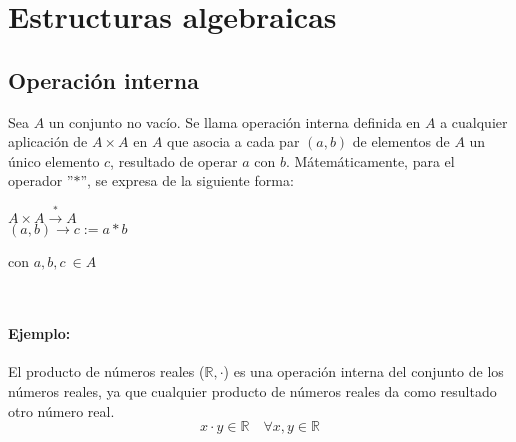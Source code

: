 \documentclass[0_algebra.tex]{subfiles}
\begin{document}
\setcounter{chapter}{1}

\chapter{Estructuras algebraicas}

\section{Operación interna}
Sea $A$ un conjunto no vacío. Se llama operación interna definida en $A$ a cualquier aplicación de $A \times A$ en $A$ que asocia a cada par $(a,b)$ de elementos de $A$ un único elemento $c$, resultado de operar $a$ con $b$. Mátemáticamente, para el operador ''$*$'', se expresa de la siguiente forma:\\

\begin{minipage}{0.5\textwidth}
\begin{center}
$A\times A \overset{*}{\rightarrow} A$\\
$(a,b) \rightarrow c:=a*b$
\end{center}
\end{minipage}
\begin{minipage}{0.5\textwidth}
con $a,b,c \ \in A$
\end{minipage}\\

\subsubsection*{Ejemplo: }
El producto de números reales ($\mathbb{R}, \cdot $) es una operación interna del conjunto de los números reales, ya que cualquier producto de números reales da como resultado otro número real.
$$
x \cdot y \in \mathbb{R} \quad \forall x,y \in \mathbb{R}
$$
\end{document}
